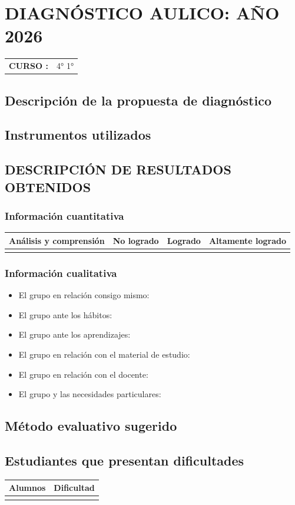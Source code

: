 \documentclass[../main.tex]{subfiles}
\begin{document}
\section*{DIAGNÓSTICO AULICO: AÑO 2026}
\begin{tabular}{r l}
	\textbf{CURSO :} & 4° 1° \\
\end{tabular}

\subsection*{Descripción de la propuesta de diagnóstico}

\subsection*{Instrumentos utilizados}

\subsection*{DESCRIPCIÓN DE RESULTADOS OBTENIDOS}

\subsubsection*{Información cuantitativa}
\begin{longtable}{|p{4cm}|p{3cm}|p{3cm}|p{3cm}|}
	\hline
	Análisis y comprensión & No logrado & Logrado & Altamente logrado \\ \hline
	                       &            &         &                   \\ \hline
\end{longtable}

\subsubsection*{Información cualitativa}
\begin{itemize}
	\item El grupo en relación consigo mismo:
	\item El grupo ante los hábitos:
	\item El grupo ante los aprendizajes:
	\item El grupo en relación con el material de estudio:
	\item El grupo en relación con el docente:
	\item El grupo y las necesidades particulares:
\end{itemize}

\subsection*{Método evaluativo sugerido}

\subsection*{Estudiantes que presentan dificultades}
\begin{longtable}{|p{6cm}|p{6cm}|}
	\hline
	Alumnos & Dificultad \\ \hline
	        &            \\ \hline
\end{longtable}
\end{document}
